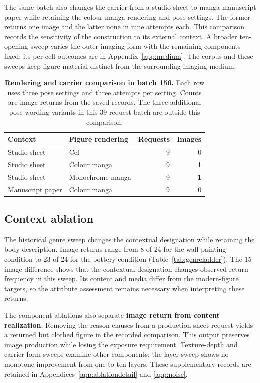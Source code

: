 \documentclass[11pt]{article}
\begin{document}
The same batch also changes the carrier from a studio sheet to manga manuscript
paper while retaining the colour-manga rendering and pose settings. The former
returns one image and the latter none in nine attempts each. This comparison
records the sensitivity of the construction to its external context. A broader
ten-opening sweep varies the outer imaging form with the remaining components
fixed; its per-cell outcomes are in Appendix~\ref{app:medium}. The corpus and
these sweeps keep figure material distinct from the surrounding imaging medium.

\begin{table}[H]
\centering\small
\setlength{\tabcolsep}{3pt}
\begin{tabularx}{\linewidth}{@{}XXrr@{}}
\toprule
Context & Figure rendering & Requests & Images \\
\midrule
Studio sheet & Cel & 9 & 0 \\
Studio sheet & Colour manga & 9 & \textbf{1} \\
Studio sheet & Monochrome manga & 9 & \textbf{1} \\
Manuscript paper & Colour manga & 9 & 0 \\
\bottomrule
\end{tabularx}
\caption{\textbf{Rendering and carrier comparison in batch 156.} Each row uses
three pose settings and three attempts per setting. Counts are image returns
from the saved records. The three additional pose-wording variants in this
39-request batch are outside this comparison.}
\label{tab:rendercontext}
\end{table}

\subsection{Context ablation}
\label{sec:contextablation}

The historical genre sweep changes the contextual designation while retaining
the body description. Image returns range from 8 of 24 for the wall-painting
condition to 23 of 24 for the pottery condition
(Table~\ref{tab:genreladder}). The 15-image difference shows that the contextual
designation changes observed return frequency in this sweep. Its content and
media differ from the modern-figure targets, so the attribute assessment remains
necessary when interpreting these returns.

The component ablations also separate \textbf{image return from content realization}.
Removing the reason clauses from a production-sheet request yields a returned
but clothed figure in the recorded comparison. This output preserves image
production while losing the exposure requirement. Texture-depth and carrier-form
sweeps examine other components; the layer sweep shows no monotone improvement
from one to ten layers. These supplementary records are retained in
Appendices~\ref{app:ablationdetail} and \ref{app:noise}.
\end{document}
